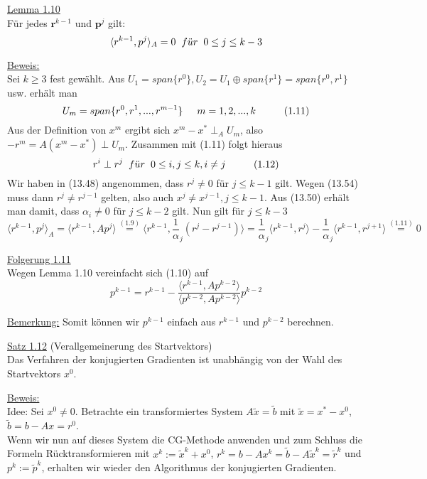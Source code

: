 \documentclass[a4paper]{letter}
\begin{document}
\underline{Lemma 1.10}
\\F\"ur jedes $\textbf{r}^{k-1}$ und $\textbf{p}^{j}$ gilt:
$$\langle r^{k-1}, p^{j} \rangle _{A} = 0 \hspace{2mm} f\ddot{u}r \hspace{2mm} 0 \le j \le k-3$$

\underline{Beweis:}
\\Sei $k \ge 3$ fest gew\"ahlt. Aus $U_{1} = span\{r^{0}\}, U_{2} = U_{1} \oplus span\{r^{1}\} = span\{r^{0}, r^{1}\}$ usw. erh\"alt man
$$U_{m} = span\{r^{0}, r^{1},...,r^{m-1}\} \hspace{5mm} m = 1,2,...,k \hspace{10mm} (1.11)$$
Aus der Definition von $x^{m}$ ergibt sich $x^{m} - x^{*} \perp_{A} U_{m}$, also $-r^{m} = A(x^{m} - x^{*}) \perp U_{m}$. Zusammen mit (1.11) folgt hieraus
$$r^{i} \perp r^{j} \hspace{2mm} f\ddot{u}r \hspace{2mm} 0 \le i,j \le k, i \ne j \hspace{10mm} (1.12)$$
Wir haben in (13.48) angenommen, dass $r^{j} \ne 0$ f\"ur $j \le k-1$ gilt. Wegen (13.54) muss dann $r^{j} \ne r^{j-1}$ gelten, also auch $x^{j} \ne x^{j-1}, j \le k-1$. Aus (13.50) erh\"alt man damit,
dass $\alpha_{i} \ne 0$ f\"ur $j \le k-2$ gilt. Nun gilt f\"ur $j \le k-3$
$$\langle r^{k-1}, p^{j} \rangle _{A} =
\langle r^{k-1}, Ap^{j} \rangle \overset{(1.9)}{=} \langle r^{k-1}, {\frac 1 \alpha_{j} (r^{j} - r^{j-1})} \rangle =
\frac 1 \alpha_{j} \langle r^{k-1}, r^{j} \rangle - \frac 1 \alpha_{j} \langle r^{k-1}, r^{j+1} \rangle \overset{(1.11)}{=} 0$$

\underline{Folgerung 1.11}
\\Wegen Lemma 1.10 vereinfacht sich (1.10) auf
$$p^{k-1} = r^{k-1} - \frac {\langle r^{k-1}, Ap^{k-2} \rangle} {\langle p^{k-2}, Ap^{k-2} \rangle} p^{k-2}$$

\underline{Bemerkung:}
Somit k\"onnen wir $p^{k-1}$ einfach aus $r^{k-1}$ und $p^{k-2}$ berechnen.

\underline{Satz 1.12} (Verallgemeinerung des Startvektors)
\\Das Verfahren der konjugierten Gradienten ist unabh\"angig von der Wahl des Startvektors $x^{0}$.

\underline{Beweis:}
\\Idee: Sei $x^{0} \ne 0$. Betrachte ein transformiertes System $A\tilde x = \tilde b$ mit $\tilde x = x^{*} - x^{0}$, $\tilde b = b - Ax = r^{0}$.
\\Wenn wir nun auf dieses System die CG-Methode anwenden und zum Schluss die Formeln R\"ucktransformieren mit $x^{k} := \tilde x^{k} + x^{0}$, $r^{k} = b- Ax^{k} = \tilde b - A\tilde x^{k} = \tilde r^{k}$ und $p^{k} := \tilde p^{k}$, erhalten wir wieder den Algorithmus der konjugierten Gradienten.
\end{document}
